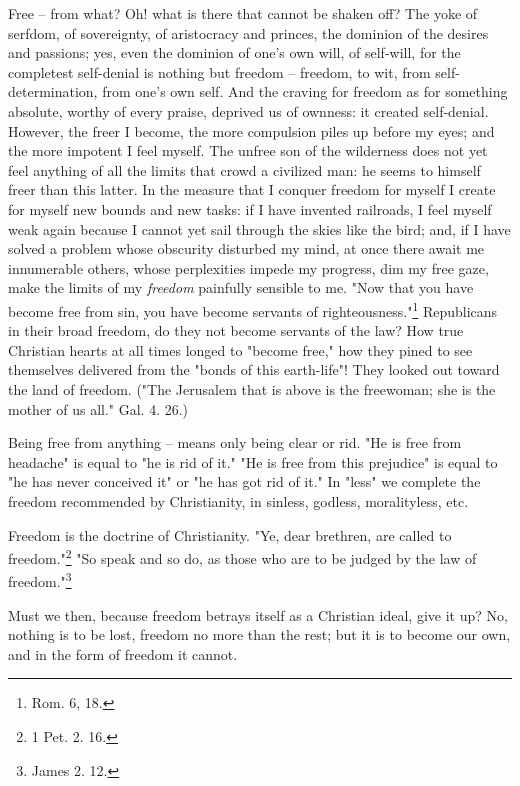 \documentclass[a4paper]{book}
\begin{document}
Free -- from what? Oh! what is there that cannot be shaken off? The yoke of 
serfdom, of sovereignty, of aristocracy and princes, the dominion of the 
desires and passions; yes, even the dominion of one's own will, of self-will, 
for the completest self-denial is nothing but freedom -- freedom, to wit, from 
self-determination, from one's own self. And the craving for freedom as for 
something absolute, worthy of every praise, deprived us of ownness: it created 
self-denial. However, the freer I become, the more compulsion piles up before 
my eyes; and the more impotent I feel myself. The unfree son of the wilderness 
does not yet feel anything of all the limits that crowd a civilized man: he 
seems to himself freer than this latter. In the measure that I conquer freedom 
for myself I create for myself new bounds and new tasks: if I have invented 
railroads, I feel myself weak again because I cannot yet sail through the 
skies like the bird; and, if I have solved a problem whose obscurity disturbed 
my mind, at once there await me innumerable others, whose perplexities impede 
my progress, dim my free gaze, make the limits of my \textit{freedom} 
painfully sensible to me. "{}Now that you have become free from sin, you have 
become servants of righteousness."{}\footnote{Rom. 6, 18.} Republicans in 
their broad freedom, do they not become servants of the law? How true 
Christian hearts at all times longed to "{}become free,"{} how they pined to 
see themselves delivered from the "{}bonds of this earth-life"{}! They looked 
out toward the land of freedom. ("{}The Jerusalem that is above is the 
freewoman; she is the mother of us all."{} Gal. 4. 26.)

Being free from anything -- means only being clear or rid. "{}He is free from 
headache"{} is equal to "{}he is rid of it."{} "{}He is free from this 
prejudice"{} is equal to "{}he has never conceived it"{} or "{}he has got rid 
of it."{} In "{}less"{} we complete the freedom recommended by Christianity, 
in sinless, godless, moralityless, etc.

 Freedom is the doctrine of Christianity. "{}Ye, dear brethren, are called to 
freedom."{}\footnote{1 Pet. 2. 16.} "{}So speak and so do, as those who are to 
be judged by the law of freedom."{}\footnote{James 2. 12.}

Must we then, because freedom betrays itself as a Christian ideal, give it up? 
No, nothing is to be lost, freedom no more than the rest; but it is to become 
our own, and in the form of freedom it cannot.
\end{document}
